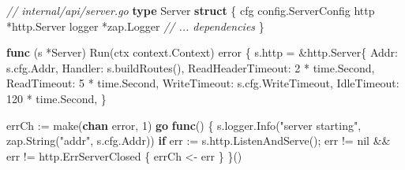 \documentclass[
]{article}
\newenvironment{Shaded}{}{}
\newcommand{\BuiltInTok}[1]{\textcolor[rgb]{0.00,0.50,0.00}{#1}}
\newcommand{\CommentTok}[1]{\textcolor[rgb]{0.38,0.63,0.69}{\textit{#1}}}
\newcommand{\ControlFlowTok}[1]{\textcolor[rgb]{0.00,0.44,0.13}{\textbf{#1}}}
\newcommand{\DataTypeTok}[1]{\textcolor[rgb]{0.56,0.13,0.00}{#1}}
\newcommand{\DecValTok}[1]{\textcolor[rgb]{0.25,0.63,0.44}{#1}}
\newcommand{\KeywordTok}[1]{\textcolor[rgb]{0.00,0.44,0.13}{\textbf{#1}}}
\newcommand{\NormalTok}[1]{#1}
\newcommand{\OperatorTok}[1]{\textcolor[rgb]{0.40,0.40,0.40}{#1}}
\newcommand{\OtherTok}[1]{\textcolor[rgb]{0.00,0.44,0.13}{#1}}
\newcommand{\StringTok}[1]{\textcolor[rgb]{0.25,0.44,0.63}{#1}}
\begin{document}
\begin{Shaded}
\begin{Highlighting}[]
\CommentTok{// internal/api/server.go}
\KeywordTok{type}\NormalTok{ Server }\KeywordTok{struct} \OperatorTok{\{}
\NormalTok{    cfg     config}\OperatorTok{.}\NormalTok{ServerConfig}
\NormalTok{    http    }\OperatorTok{*}\NormalTok{http}\OperatorTok{.}\NormalTok{Server}
\NormalTok{    logger  }\OperatorTok{*}\NormalTok{zap}\OperatorTok{.}\NormalTok{Logger}
    \CommentTok{// ... dependencies}
\OperatorTok{\}}

\KeywordTok{func} \OperatorTok{(}\NormalTok{s }\OperatorTok{*}\NormalTok{Server}\OperatorTok{)}\NormalTok{ Run}\OperatorTok{(}\NormalTok{ctx context}\OperatorTok{.}\NormalTok{Context}\OperatorTok{)} \DataTypeTok{error} \OperatorTok{\{}
\NormalTok{    s}\OperatorTok{.}\NormalTok{http }\OperatorTok{=} \OperatorTok{\&}\NormalTok{http}\OperatorTok{.}\NormalTok{Server}\OperatorTok{\{}
\NormalTok{        Addr}\OperatorTok{:}\NormalTok{              s}\OperatorTok{.}\NormalTok{cfg}\OperatorTok{.}\NormalTok{Addr}\OperatorTok{,}
\NormalTok{        Handler}\OperatorTok{:}\NormalTok{           s}\OperatorTok{.}\NormalTok{buildRoutes}\OperatorTok{(),}
\NormalTok{        ReadHeaderTimeout}\OperatorTok{:} \DecValTok{2} \OperatorTok{*}\NormalTok{ time}\OperatorTok{.}\NormalTok{Second}\OperatorTok{,}
\NormalTok{        ReadTimeout}\OperatorTok{:}       \DecValTok{5} \OperatorTok{*}\NormalTok{ time}\OperatorTok{.}\NormalTok{Second}\OperatorTok{,}
\NormalTok{        WriteTimeout}\OperatorTok{:}\NormalTok{      s}\OperatorTok{.}\NormalTok{cfg}\OperatorTok{.}\NormalTok{WriteTimeout}\OperatorTok{,}
\NormalTok{        IdleTimeout}\OperatorTok{:}       \DecValTok{120} \OperatorTok{*}\NormalTok{ time}\OperatorTok{.}\NormalTok{Second}\OperatorTok{,}
    \OperatorTok{\}}

\NormalTok{    errCh }\OperatorTok{:=} \BuiltInTok{make}\OperatorTok{(}\KeywordTok{chan} \DataTypeTok{error}\OperatorTok{,} \DecValTok{1}\OperatorTok{)}
    \ControlFlowTok{go} \KeywordTok{func}\OperatorTok{()} \OperatorTok{\{}
\NormalTok{        s}\OperatorTok{.}\NormalTok{logger}\OperatorTok{.}\NormalTok{Info}\OperatorTok{(}\StringTok{"server starting"}\OperatorTok{,}\NormalTok{ zap}\OperatorTok{.}\NormalTok{String}\OperatorTok{(}\StringTok{"addr"}\OperatorTok{,}\NormalTok{ s}\OperatorTok{.}\NormalTok{cfg}\OperatorTok{.}\NormalTok{Addr}\OperatorTok{))}
        \ControlFlowTok{if}\NormalTok{ err }\OperatorTok{:=}\NormalTok{ s}\OperatorTok{.}\NormalTok{http}\OperatorTok{.}\NormalTok{ListenAndServe}\OperatorTok{();}\NormalTok{ err }\OperatorTok{!=} \OtherTok{nil} \OperatorTok{\&\&}\NormalTok{ err }\OperatorTok{!=}\NormalTok{ http}\OperatorTok{.}\NormalTok{ErrServerClosed }\OperatorTok{\{}
\NormalTok{            errCh }\OperatorTok{\textless{}{-}}\NormalTok{ err}
        \OperatorTok{\}}
    \OperatorTok{\}()}


\end{Highlighting}
\end{Shaded}
\end{document}

